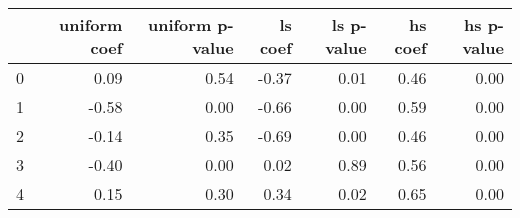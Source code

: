 \begin{tabular}{lrrrrrr}
\toprule
 & uniform coef & uniform p-value & ls coef & ls p-value & hs coef & hs p-value \\
\midrule
0 & 0.09 & 0.54 & -0.37 & 0.01 & 0.46 & 0.00 \\
1 & -0.58 & 0.00 & -0.66 & 0.00 & 0.59 & 0.00 \\
2 & -0.14 & 0.35 & -0.69 & 0.00 & 0.46 & 0.00 \\
3 & -0.40 & 0.00 & 0.02 & 0.89 & 0.56 & 0.00 \\
4 & 0.15 & 0.30 & 0.34 & 0.02 & 0.65 & 0.00 \\
\bottomrule
\end{tabular}
